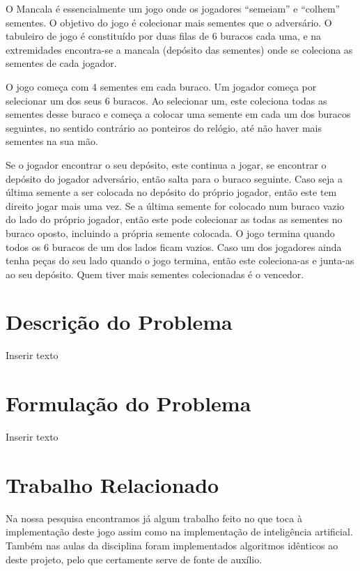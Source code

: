 \documentclass[conference]{IEEEtran}
\begin{document}
O Mancala \'e essencialmente um jogo onde os jogadores “semeiam” e “colhem” sementes\cite{b1}.
O objetivo do jogo \'e colecionar mais sementes que o advers\'ario.
O tabuleiro de jogo \'e constituído por duas filas de 6 buracos cada uma, e na extremidades encontra-se  a mancala (dep\'osito das sementes) onde se coleciona as sementes de cada jogador.

O jogo começa com 4 sementes em cada buraco. Um jogador começa por selecionar um dos seus 6 buracos. Ao selecionar um, este coleciona todas as sementes desse buraco e começa a colocar uma semente em cada um dos buracos seguintes, no sentido contr\'ario ao ponteiros do rel\'ogio, at\'e n\~ao haver mais sementes na sua m\~ao.

Se o jogador encontrar o seu dep\'osito, este continua a jogar, se encontrar o dep\'osito do jogador advers\'ario, ent\~ao salta para o buraco seguinte. Caso seja a \'ultima semente a ser colocada no dep\'osito do pr\'oprio jogador, ent\~ao este tem direito jogar mais uma vez.
Se a \'ultima semente for colocado num buraco vazio do lado do pr\'oprio jogador, ent\~ao este pode colecionar as todas as sementes no buraco oposto, incluindo a pr\'opria semente colocada.
O jogo termina quando todos os 6 buracos de um dos lados ficam vazios. Caso um dos jogadores ainda tenha peças do seu lado quando o jogo termina, ent\~ao este coleciona-as e junta-as ao seu dep\'osito. 
Quem tiver mais sementes colecionadas \'e o vencedor.


\section{Descri\c c\~ao do Problema}
Inserir texto

\section{Formula\c c\~ao do Problema}
Inserir texto

\section{Trabalho Relacionado}

Na nossa pesquisa encontramos j\'a algum trabalho feito no que toca \`a implementa\c c\~ao deste jogo assim como na implementa\c c\~ao de intelig\^encia artificial\cite{b2}\cite{b3}.
Tamb\'em nas aulas da disciplina foram implementados algoritmos id\^enticos ao deste projeto, pelo que certamente serve de fonte de auxílio.
\end{document}
